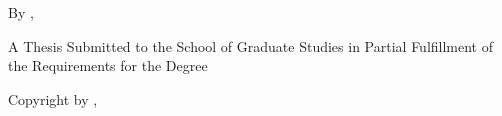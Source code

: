 \null %
\vspace{0.2\textheight}

\begin{center}
  \MakeUppercase{\thesisTitle}

  \vspace{2cm}

  By \MakeUppercase{\thesisAuthorName}, \thesisAuthorCredentials{}

  \vfill

  A Thesis Submitted to the School of Graduate Studies in Partial Fulfillment of
  the Requirements for the Degree \thesisTargetDegree{}

  \vspace{2cm}

  \thesisInstitution{} \textcopyright{} Copyright by \thesisAuthorName{}, \thesisSubmissionMonthYear{}

\end{center}
